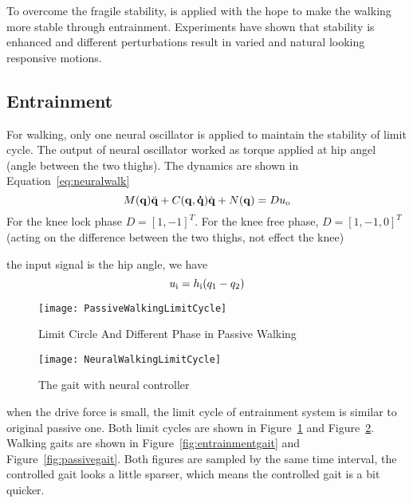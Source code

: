 To overcome the fragile stability, \cpg is applied with the hope to make the walking more stable through entrainment.
Experiments have shown that stability is enhanced and different perturbations result in varied and natural looking responsive motions.




\subsection{Entrainment}
For walking, only one neural oscillator is applied to maintain the stability of limit cycle.
The output of neural oscillator worked as torque applied at hip angel (angle between the two thighs).
The dynamics are shown in Equation~\ref{eq:neuralwalk}
\begin{equation}
\label{eq:neuralwalk}
M(\mathbf{q}) \ddot{\mathbf{q}} + C(\mathbf{q,\dot{q}})\dot{\mathbf{q}} + N(\mathbf{q}) = Du_{\mathrm{o}}
\end{equation}
For the knee lock phase $D=[1,-1]^T$.
For the knee free phase, $D=[1,-1,0]^T$(acting on the difference between the two thighs, not effect the knee)

the input signal is the hip angle,
we have 
\[
	u_{\mathrm{i}}=h_{\mathrm{i}}(q_1-q_2)
\]





\begin{figure}[!htbp]
  \begin{center}
    \texttt{[image: PassiveWalkingLimitCycle]}
    \caption{Limit Circle And Different Phase in Passive Walking}
    \label{fig:passivegaitlimitcycle}
\end{center}
\end{figure}


\begin{figure}[!htbp]
  \begin{center}
      \texttt{[image: NeuralWalkingLimitCycle]}
    \caption{The gait with neural controller}
    \label{fig:entrainmentgaitlimitcyle}
\end{center}
\end{figure}
when the drive force is small, the limit cycle of entrainment system is similar to original passive one.
Both limit cycles are shown in Figure~\ref{fig:passivegaitlimitcycle} and Figure~\ref{fig:entrainmentgaitlimitcyle}.
Walking gaits are shown in Figure~\ref{fig:entrainmentgait} and Figure~\ref{fig:passivegait}.
Both figures are sampled by the same time interval, the controlled gait looks a little sparser, which means the controlled gait is a bit quicker. 




